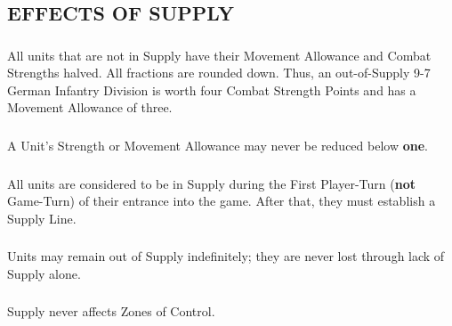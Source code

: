 \subsection{EFFECTS OF SUPPLY}

\subsubsection{} All units that are not in Supply have their Movement Allowance and Combat Strengths halved. All fractions are rounded down. Thus, an out-of-Supply 9-7 German Infantry Division is worth four Combat Strength Points and has a Movement Allowance of three.

\subsubsection{} A Unit's Strength or Movement Allowance may never be reduced below \textbf{one}.

\subsubsection{} All units are considered to be in Supply during the First Player-Turn (\textbf{not} Game-Turn) of their entrance into the game. After that, they must establish a Supply Line.

\subsubsection{} Units may remain out of Supply indefinitely; they are never lost through lack of Supply alone.

\subsubsection{} Supply never affects Zones of Control.